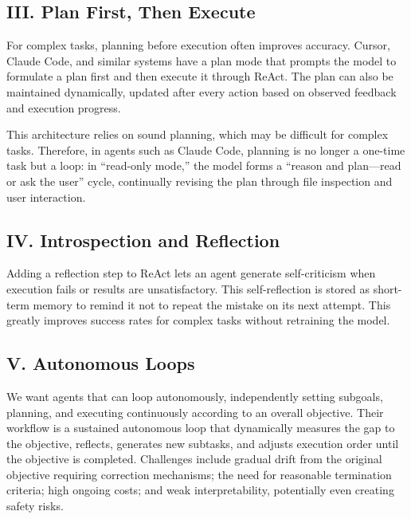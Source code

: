 \hypertarget{iii.-plan-first-then-execute}{%
\subsection{III. Plan First, Then Execute}\label{iii.-plan-first-then-execute}}

For complex tasks, planning before execution often improves accuracy. Cursor, Claude Code, and similar systems have a plan mode that prompts the model to formulate a plan first and then execute it through ReAct. The plan can also be maintained dynamically, updated after every action based on observed feedback and execution progress.

This architecture relies on sound planning, which may be difficult for complex tasks. Therefore, in agents such as Claude Code, planning is no longer a one-time task but a loop: in ``read-only mode,'' the model forms a ``reason and plan---read or ask the user'' cycle, continually revising the plan through file inspection and user interaction.

\hypertarget{iv.-introspection-and-reflection}{%
\subsection{IV. Introspection and Reflection}\label{iv.-introspection-and-reflection}}

Adding a reflection step to ReAct lets an agent generate self-criticism when execution fails or results are unsatisfactory. This self-reflection is stored as short-term memory to remind it not to repeat the mistake on its next attempt. This greatly improves success rates for complex tasks without retraining the model.

\hypertarget{v.-autonomous-loops}{%
\subsection{V. Autonomous Loops}\label{v.-autonomous-loops}}

We want agents that can loop autonomously, independently setting subgoals, planning, and executing continuously according to an overall objective. Their workflow is a sustained autonomous loop that dynamically measures the gap to the objective, reflects, generates new subtasks, and adjusts execution order until the objective is completed. Challenges include gradual drift from the original objective requiring correction mechanisms; the need for reasonable termination criteria; high ongoing costs; and weak interpretability, potentially even creating safety risks.

